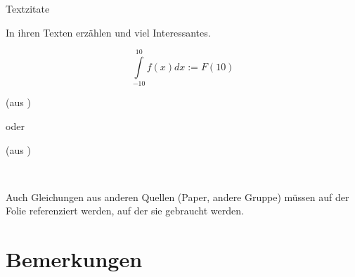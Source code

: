 \documentclass[aspectratio=169]{beamer}
\begin{document}
\begin{frame}{Textzitate}{ }


In ihren Texten erz\"{a}hlen \cite{Gompf2006}  und \cite{Klinkicht2013}  viel Interessantes.

\begin{equation*}
  \int\limits_{-10}^{10} f(x)   dx := F(10)
\end{equation*}

(aus \cite{Ameisennebel} )


oder

(aus \cite{Ameisennebel} )

$_{}$

Auch Gleichungen aus anderen Quellen (Paper, andere Gruppe) m\"{u}ssen auf der Folie referenziert werden, auf der sie gebraucht werden.

\end{frame}


\section{Bemerkungen}
\end{document}
